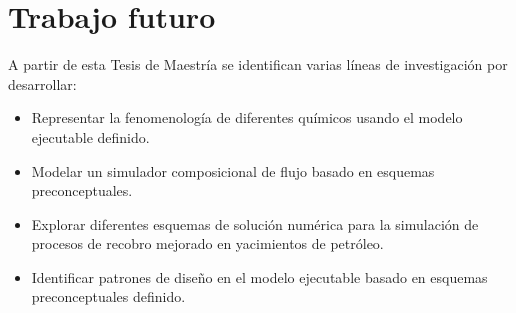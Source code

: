\section{Trabajo futuro}

A partir de esta Tesis de Maestría se identifican varias líneas de investigación por desarrollar:

\begin{itemize}
	\item Representar la fenomenología de diferentes químicos usando el modelo ejecutable definido.
	\item Modelar un simulador composicional de flujo basado en esquemas preconceptuales.
	\item Explorar diferentes esquemas de solución numérica para la simulación de procesos de recobro mejorado en yacimientos de petróleo.
	\item Identificar patrones de diseño en el modelo ejecutable basado en esquemas preconceptuales definido.
\end{itemize}

